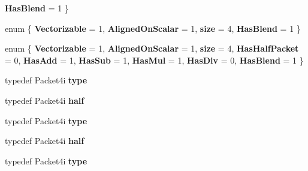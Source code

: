 \begin{DoxyCompactItemize}
{\bfseries Has\+Blend} = 1
 \}
\item 
\mbox{\label{struct_eigen_1_1internal_1_1packet__traits_3_01int_01_4_a83b6f94b5654e7f92d7d07efa9e5fd6f}} 
enum \{ {\bfseries Vectorizable} = 1, 
{\bfseries Aligned\+On\+Scalar} = 1, 
{\bfseries size} = 4, 
{\bfseries Has\+Blend} = 1
 \}
\item 
\mbox{\label{struct_eigen_1_1internal_1_1packet__traits_3_01int_01_4_aa67d9320e1410842e622c5cb2a532f41}} 
enum \{ \newline
{\bfseries Vectorizable} = 1, 
{\bfseries Aligned\+On\+Scalar} = 1, 
{\bfseries size} = 4, 
{\bfseries Has\+Half\+Packet} = 0, 
\newline
{\bfseries Has\+Add} = 1, 
{\bfseries Has\+Sub} = 1, 
{\bfseries Has\+Mul} = 1, 
{\bfseries Has\+Div} = 0, 
\newline
{\bfseries Has\+Blend} = 1
 \}
\item 
\mbox{\label{struct_eigen_1_1internal_1_1packet__traits_3_01int_01_4_a4c035d9ce275515f3eabf2934623190b}} 
typedef Packet4i {\bfseries type}
\item 
\mbox{\label{struct_eigen_1_1internal_1_1packet__traits_3_01int_01_4_abcd1d398b42e5452213afe6652f7cebb}} 
typedef Packet4i {\bfseries half}
\item 
\mbox{\label{struct_eigen_1_1internal_1_1packet__traits_3_01int_01_4_a4c035d9ce275515f3eabf2934623190b}} 
typedef Packet4i {\bfseries type}
\item 
\mbox{\label{struct_eigen_1_1internal_1_1packet__traits_3_01int_01_4_abcd1d398b42e5452213afe6652f7cebb}} 
typedef Packet4i {\bfseries half}
\item 
\mbox{\label{struct_eigen_1_1internal_1_1packet__traits_3_01int_01_4_a4c035d9ce275515f3eabf2934623190b}} 
typedef Packet4i {\bfseries type}
\item 
\mbox{\label{struct_eigen_1_1internal_1_1packet__traits_3_01int_01_4_abcd1d398b42e5452213afe6652f7cebb}} 

\end{DoxyCompactItemize}
